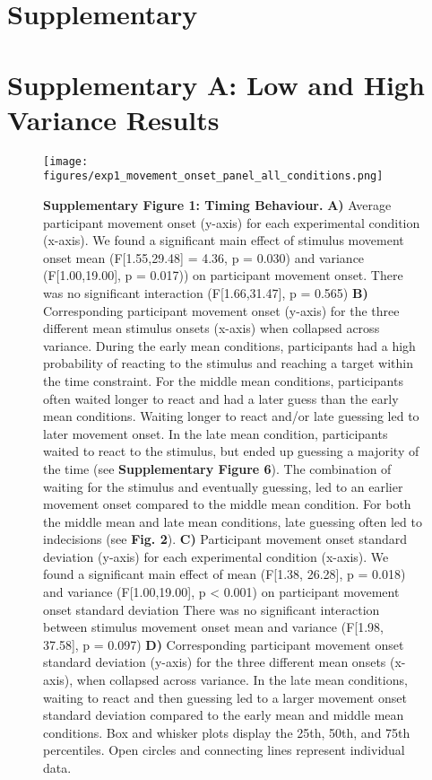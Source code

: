 \documentclass[12pt]{article}
\newcommand\boldblue[1]{\textcolor{mydarkblue}{\textbf{#1}}}
\begin{document}
\section{Supplementary}

\section{Supplementary A: Low and High Variance Results}
\begin{figure}[H]
    \centering
    \texttt{[image: figures/exp1\_movement\_onset\_panel\_all\_conditions.png]}
    \caption*{\boldblue{Supplementary Figure 1: Timing Behaviour.} \boldblue{A)} Average participant movement onset (y-axis) for each experimental condition (x-axis). We found a significant main effect of stimulus movement onset mean (F[1.55,29.48] = 4.36, p = 0.030) and variance (F[1.00,19.00], p = 0.017)) on participant movement onset. There was no significant interaction (F[1.66,31.47], p = 0.565) \boldblue{B)} Corresponding participant movement onset (y-axis) for the three different mean stimulus onsets (x-axis) when collapsed across variance. During the early mean conditions, participants had a high probability of reacting to the stimulus and reaching a target within the time constraint. For the middle mean conditions, participants often waited longer to react and had a later guess than the early mean conditions. Waiting longer to react and/or late guessing led to later movement onset. In the late mean condition, participants waited to react to the stimulus, but ended up guessing a majority of the time (see \boldblue{Supplementary Figure 6}). The combination of waiting for the stimulus and eventually guessing, led to an earlier movement onset compared to the middle mean condition. For both the middle mean and late mean conditions, late guessing often led to indecisions (see \boldblue{Fig. 2}). \boldblue{C)} Participant movement onset standard deviation (y-axis) for each experimental condition (x-axis). We found a significant main effect of mean (F[1.38, 26.28], p = 0.018) and variance (F[1.00,19.00], p < 0.001) on participant movement onset standard deviation There was no significant interaction between stimulus movement onset mean and variance (F[1.98, 37.58], p = 0.097) \boldblue{D)} Corresponding participant movement onset standard deviation (y-axis) for the three different mean onsets (x-axis), when collapsed across variance. In the late mean conditions, waiting to react and then guessing led to a larger movement onset standard deviation compared to the early mean and middle mean conditions. Box and whisker plots display the 25th, 50th, and 75th percentiles. Open circles and connecting lines represent individual data.}
\end{figure}
\end{document}
